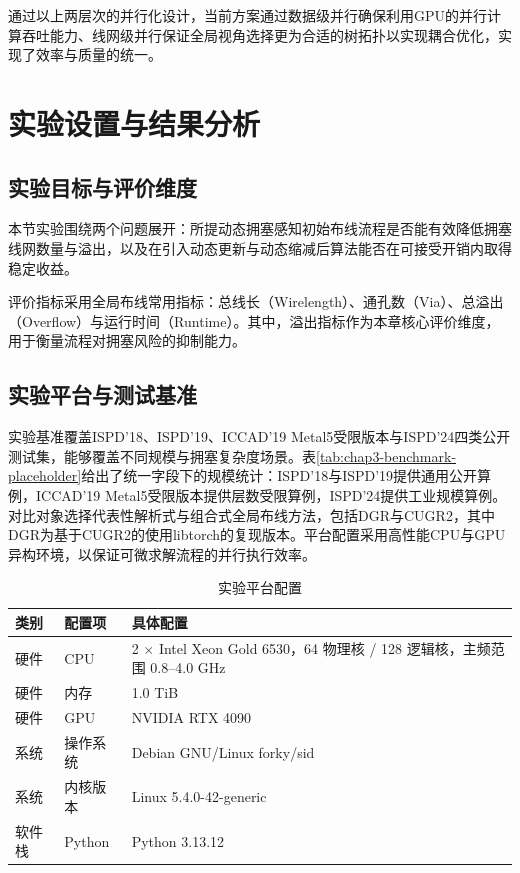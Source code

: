 通过以上两层次的并行化设计，当前方案通过数据级并行确保利用GPU的并行计算吞吐能力、线网级并行保证全局视角选择更为合适的树拓扑以实现耦合优化，实现了效率与质量的统一。

\section{实验设置与结果分析}
\label{sec:chap3-exp}

\subsection{实验目标与评价维度}

本节实验围绕两个问题展开：所提动态拥塞感知初始布线流程是否能有效降低拥塞线网数量与溢出，以及在引入动态更新与动态缩减后算法能否在可接受开销内取得稳定收益。

评价指标采用全局布线常用指标：总线长（Wirelength）、通孔数（Via）、总溢出（Overflow）与运行时间（Runtime）。其中，溢出指标作为本章核心评价维度，用于衡量流程对拥塞风险的抑制能力。

\subsection{实验平台与测试基准}

实验基准覆盖ISPD'18、ISPD'19、ICCAD'19 Metal5受限版本与ISPD'24四类公开测试集，能够覆盖不同规模与拥塞复杂度场景。表\ref{tab:chap3-benchmark-placeholder}给出了统一字段下的规模统计：ISPD'18与ISPD'19提供通用公开算例，ICCAD'19 Metal5受限版本提供层数受限算例，ISPD'24提供工业规模算例。对比对象选择代表性解析式与组合式全局布线方法，包括DGR\cite{10.1145/3649329.3656530}与CUGR2\cite{10.1109/DAC56929.2023.10247702}，其中DGR为基于CUGR2的使用libtorch的复现版本。平台配置采用高性能CPU与GPU异构环境，以保证可微求解流程的并行执行效率。

\begin{table}[!htbp]
    \centering
    \caption{实验平台配置}
    \label{tab:chap3-platform-placeholder}
    \begin{tabular}{p{}p{}p{}}
        \hline
        类别 & 配置项 & 具体配置 \\
        \hline
        硬件 & CPU & 2 $\times$ Intel Xeon Gold 6530，64 物理核 / 128 逻辑核，主频范围 0.8--4.0 GHz \\
        硬件 & 内存 & 1.0 TiB \\
        硬件 & GPU & NVIDIA RTX 4090 \\
        系统 & 操作系统 & Debian GNU/Linux forky/sid \\
        系统 & 内核版本 & Linux 5.4.0-42-generic \\
        软件栈 & Python & Python 3.13.12 \\
        \hline
    \end{tabular}
\end{table}

